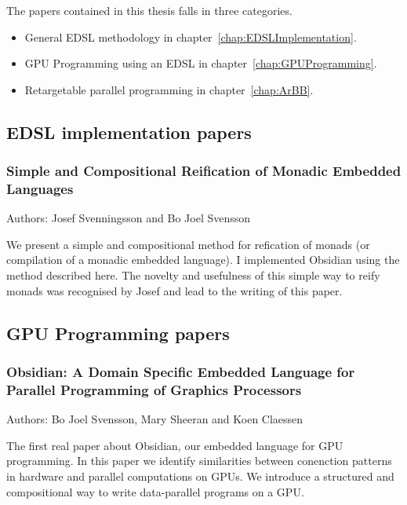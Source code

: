 \documentclass[a4paper]{book}
\newcommand{\paperBB}{Simple and Compositional Reification of Monadic Embedded Languages}
\newcommand{\paperIFL}{Obsidian: A Domain Specific Embedded Language for Parallel Programming of Graphics Processors}
\begin{document}
The papers contained in this thesis falls in three categories. 
\begin{itemize} 
\item General EDSL methodology in chapter~\ref{chap:EDSLImplementation}. 
\item GPU Programming using an EDSL in chapter~\ref{chap:GPUProgramming}. 
\item Retargetable parallel programming in chapter~\ref{chap:ArBB}. 
\end{itemize} 

\subsection*{EDSL implementation papers} 

\subsubsection*{\paperBB} 

Authors: Josef Svenningsson and Bo Joel Svensson 

\vspace{5mm}

\noindent We present a simple and compositional method for refication 
of monads (or compilation of a monadic embedded language). I implemented 
Obsidian using the method described here. The novelty and 
usefulness of this simple way to reify monads was recognised by Josef
and lead to the writing of this paper.  

\subsection*{GPU Programming papers} 

\subsubsection{\paperIFL}

Authors: Bo Joel Svensson, Mary Sheeran and Koen Claessen \newline

\vspace{5mm}

The first real paper about Obsidian, our embedded language for GPU 
programming. In this paper we identify similarities between 
conenction patterns in hardware and parallel computations on GPUs. 
We introduce a structured and compositional way to write data-parallel 
programs on a GPU.
\end{document}
